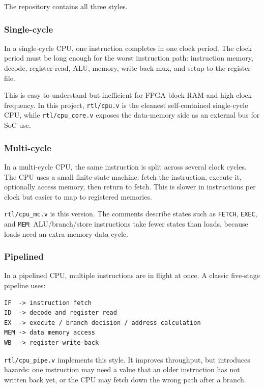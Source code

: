 The repository contains all three styles.

\subsubsection{Single-cycle}

In a single-cycle CPU, one instruction completes in one clock period. The clock period must be long enough for the worst instruction path: instruction memory, decode, register read, ALU, memory, write-back mux, and setup to the register file.

This is easy to understand but inefficient for FPGA block RAM and high clock frequency. In this project, \texttt{rtl/cpu.v} is the cleanest self-contained single-cycle CPU, while \texttt{rtl/cpu\_core.v} exposes the data-memory side as an external bus for SoC use.

\subsubsection{Multi-cycle}

In a multi-cycle CPU, the same instruction is split across several clock cycles. The CPU uses a small finite-state machine: fetch the instruction, execute it, optionally access memory, then return to fetch. This is slower in instructions per clock but easier to map to registered memories.

\texttt{rtl/cpu\_mc.v} is this version. The comments describe states such as \texttt{FETCH}, \texttt{EXEC}, and \texttt{MEM}: ALU/branch/store instructions take fewer states than loads, because loads need an extra memory-data cycle.

\subsubsection{Pipelined}

In a pipelined CPU, multiple instructions are in flight at once. A classic five-stage pipeline uses:

\begin{lstlisting}[language={}]
IF  -> instruction fetch
ID  -> decode and register read
EX  -> execute / branch decision / address calculation
MEM -> data memory access
WB  -> register write-back
\end{lstlisting}

\texttt{rtl/cpu\_pipe.v} implements this style. It improves throughput, but introduces hazards: one instruction may need a value that an older instruction has not written back yet, or the CPU may fetch down the wrong path after a branch.

\bigskip
